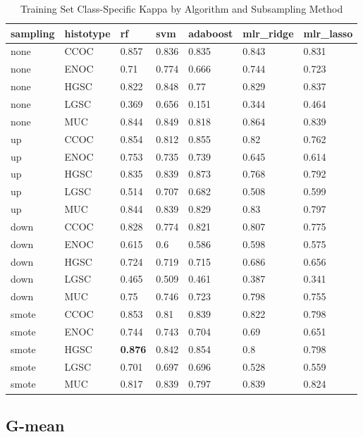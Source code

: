 \documentclass[
]{report}
\begin{document}
\begin{table}

\caption{\label{tab:train-kappa-class-table}Training Set Class-Specific Kappa by Algorithm and Subsampling Method}
\centering
\begin{tabular}[t]{l|l|l|l|l|l|l}
\hline
sampling & histotype & rf & svm & adaboost & mlr\_ridge & mlr\_lasso\\
\hline
none & CCOC & 0.857 & 0.836 & 0.835 & 0.843 & 0.831\\
\hline
none & ENOC & 0.71 & 0.774 & 0.666 & 0.744 & 0.723\\
\hline
none & HGSC & 0.822 & 0.848 & 0.77 & 0.829 & 0.837\\
\hline
none & LGSC & 0.369 & 0.656 & 0.151 & 0.344 & 0.464\\
\hline
none & MUC & 0.844 & 0.849 & 0.818 & 0.864 & 0.839\\
\hline
up & CCOC & 0.854 & 0.812 & 0.855 & 0.82 & 0.762\\
\hline
up & ENOC & 0.753 & 0.735 & 0.739 & 0.645 & 0.614\\
\hline
up & HGSC & 0.835 & 0.839 & 0.873 & 0.768 & 0.792\\
\hline
up & LGSC & 0.514 & 0.707 & 0.682 & 0.508 & 0.599\\
\hline
up & MUC & 0.844 & 0.839 & 0.829 & 0.83 & 0.797\\
\hline
down & CCOC & 0.828 & 0.774 & 0.821 & 0.807 & 0.775\\
\hline
down & ENOC & 0.615 & 0.6 & 0.586 & 0.598 & 0.575\\
\hline
down & HGSC & 0.724 & 0.719 & 0.715 & 0.686 & 0.656\\
\hline
down & LGSC & 0.465 & 0.509 & 0.461 & 0.387 & 0.341\\
\hline
down & MUC & 0.75 & 0.746 & 0.723 & 0.798 & 0.755\\
\hline
smote & CCOC & 0.853 & 0.81 & 0.839 & 0.822 & 0.798\\
\hline
smote & ENOC & 0.744 & 0.743 & 0.704 & 0.69 & 0.651\\
\hline
smote & HGSC & \textbf{0.876} & 0.842 & 0.854 & 0.8 & 0.798\\
\hline
smote & LGSC & 0.701 & 0.697 & 0.696 & 0.528 & 0.559\\
\hline
smote & MUC & 0.817 & 0.839 & 0.797 & 0.839 & 0.824\\
\hline
\end{tabular}
\end{table}

\hypertarget{g-mean}{%
\subsection{G-mean}\label{g-mean}}
\end{document}

